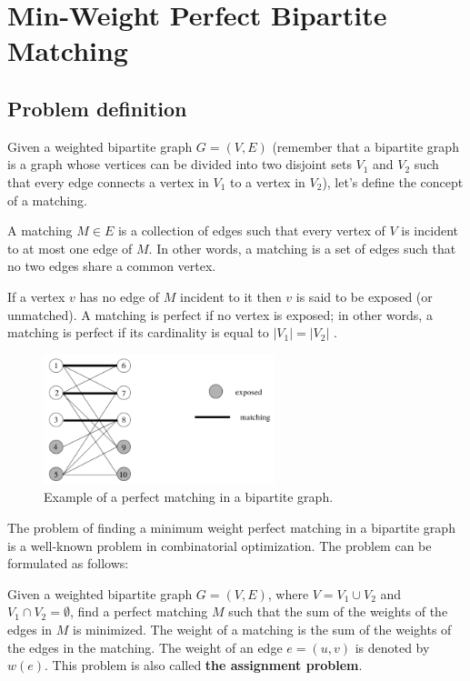 \chapter{Min-Weight Perfect Bipartite Matching}

\section{Problem definition}
Given a weighted bipartite graph $G = (V, E)$ (remember that a bipartite graph is a graph whose vertices can be divided into two disjoint sets $V_1$ and $V_2$ such that every edge connects a vertex in $V_1$ to a vertex in $V_2$), let's define the concept of a matching.
\begin{definition}[Matching] \label{def:matching}
    A matching $M \in E$ is a collection of edges such that every vertex of $V$ is incident to at most one edge of $M$. In other words, a matching is a set of edges such that no two edges share a common vertex. 
\end{definition}

If a vertex $v$ has no edge of $M$ incident to it then $v$ is said to be exposed (or unmatched). A matching is perfect if no vertex is exposed; in other words, a matching is perfect if its cardinality is equal to $|V_1| = |V_2|$ \cite{goemans2009matching}.

\begin{figure}[H]
    \centering
    \includegraphics[width=0.6\textwidth]{Immagini/matching_example.png}
    \caption{Example of a perfect matching in a bipartite graph.}
    \label{fig:matching_example}
\end{figure}

The problem of finding a minimum weight perfect matching in a bipartite graph is a well-known problem in combinatorial optimization. The problem can be formulated as follows: 

\begin{definition} \label{def:mwpbm}
    Given a weighted bipartite graph $G = (V, E)$, where $V = V_1 \cup V_2$ and $V_1 \cap V_2 = \emptyset$, find a perfect matching $M$ such that the sum of the weights of the edges in $M$ is minimized. The weight of a matching is the sum of the weights of the edges in the matching. The weight of an edge $e = (u, v)$ is denoted by $w(e)$. This problem is also called \textbf{the assignment problem}.
\end{definition}

